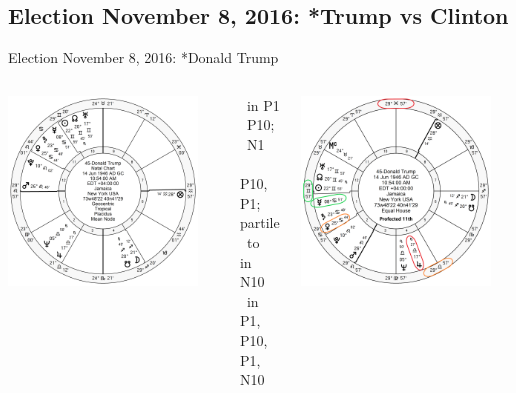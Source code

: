 \subsection{Election November 8, 2016: *Trump vs Clinton}
\begin{frame}[t]{Election November 8, 2016: *Donald Trump}
\small

\begin{columns}[T, onlytextwidth]
\vspace{-1em}
{\includegraphics[width=0.9\textwidth]{charts/Trump.png}}
\fontsize{7pt}{8pt}\selectfont

\Mercury\, in P1 \Square\, P10; \Sextile\, N1 \\
\Jupiter\, \Opposition\, P10, \Square\, P1; partile \Trine\, to \Uranus\, in N10 \\
\Venus\, in P1, \Square\, P10, \Sextile\, P1, N10

\vspace{-1em}
{\includegraphics[width=0.9\textwidth]{charts/Trump-Prof-11th.png}}
\fontsize{8pt}{9pt}\selectfont


\end{columns}
\end{frame}
